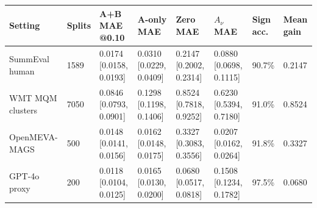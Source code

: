 \begin{tabular}{llllllll}
\toprule
Setting & Splits & A+B MAE @0.10 & A-only MAE & Zero MAE & $A_\nu$ MAE & Sign acc. & Mean gain \\
\midrule
SummEval human & 1589 & 0.0174 [0.0158, 0.0193] & 0.0310 [0.0229, 0.0409] & 0.2147 [0.2002, 0.2314] & 0.0880 [0.0698, 0.1115] & 90.7\% & 0.2147 \\
WMT MQM clusters & 7050 & 0.0846 [0.0793, 0.0901] & 0.1298 [0.1198, 0.1406] & 0.8524 [0.7818, 0.9252] & 0.6230 [0.5394, 0.7180] & 91.0\% & 0.8524 \\
OpenMEVA-MAGS & 500 & 0.0148 [0.0141, 0.0156] & 0.0162 [0.0148, 0.0175] & 0.3327 [0.3083, 0.3556] & 0.0207 [0.0162, 0.0264] & 91.8\% & 0.3327 \\
GPT-4o proxy & 200 & 0.0118 [0.0104, 0.0125] & 0.0165 [0.0130, 0.0200] & 0.0680 [0.0517, 0.0818] & 0.1508 [0.1234, 0.1782] & 97.5\% & 0.0680 \\
\bottomrule
\end{tabular}
